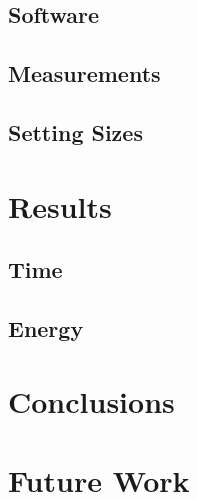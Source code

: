 \documentclass{styles/llncs}
\begin{document}
\subsection{Software}
\subsection{Measurements}
\subsection{Setting Sizes}


\section{Results}\label{sec:results}
\subsection{Time}
\subsection{Energy}


\section{Conclusions}


\section{Future Work}





\newpage
\listoftodos[Notes]
\end{document}
